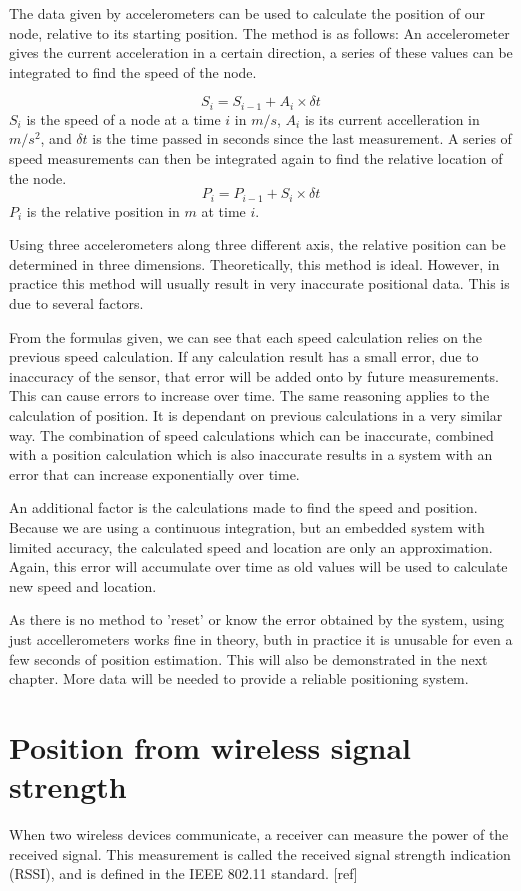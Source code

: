 \documentclass[twoside, 11pt]{uva-bachelor-thesis}
\begin{document}
The data given by accelerometers can be used to calculate the position of our node, relative to its starting position. The method is as follows: An accelerometer gives the current acceleration in a certain direction, a series of these values can be integrated to find the speed of the node. 

$$S_i = S_{i-1} + A_i \times \delta t$$ 
$S_i$ is the speed of a node at a time $i$ in $m/s$, $A_i$ is its current accelleration in $m/s^2$, and $\delta t$ is the time passed in seconds since the last measurement.
A series of speed measurements can then be integrated again to find the relative location of the node.
$$P_i = P_{i-1} + S_i \times \delta t$$
$P_i$ is the relative position in $m$ at time $i$.


Using three accelerometers along three different axis, the relative position can be determined in three dimensions. Theoretically, this method is ideal. However, in practice this method will usually result in very inaccurate positional data. This is due to several factors.

From the formulas given, we can see that each speed calculation relies on the previous speed calculation. If any calculation result has a small error, due to inaccuracy of the sensor, that error will be added onto by future measurements. This can cause errors to increase over time. The same reasoning applies to the calculation of position. It is dependant on previous calculations in a very similar way. The combination of speed calculations which can be inaccurate, combined with a position calculation which is also inaccurate results in a system with an error that can increase exponentially over time. 

An additional factor is the calculations made to find the speed and position. Because we are using a continuous integration, but an embedded system with limited accuracy, the calculated speed and location are only an approximation. Again, this error will accumulate over time as old values will be used to calculate new speed and location.

As there is no method to 'reset' or know the error obtained by the system, using just accellerometers works fine in theory, buth in practice it is unusable for even a few seconds of position estimation. This will also be demonstrated in the next chapter. More data will be needed to provide a reliable positioning system.
\section{Position from wireless signal strength}
When two wireless devices communicate, a receiver can measure the power of the received signal. This measurement is called the received signal strength indication (RSSI), and is defined in the IEEE 802.11 standard. [ref]
\end{document}
